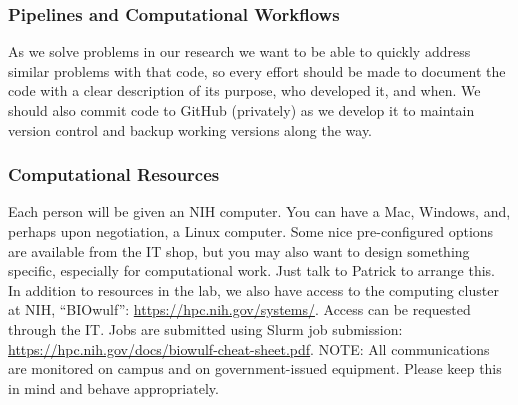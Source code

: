 \documentclass[10pt, letterpaper, twocolumn]{article} %
\begin{document}
\subsubsection{Pipelines and Computational Workflows}
As we solve problems in our research we want to be able to quickly address similar problems with that code, so every effort should be made to document the code with a clear description of its purpose, who developed it, and when. We should also commit code to GitHub (privately) as we develop it to maintain version control and backup working versions along the way. 

\subsubsection{Computational Resources}
Each person will be given an NIH computer. You can have a Mac, Windows, and, perhaps upon negotiation, a Linux computer. Some nice pre-configured options are available from the IT shop, but you may also want to design something specific, especially for computational work. Just talk to Patrick to arrange this.
In addition to resources in the lab, we also have access to the computing cluster at NIH, “BIOwulf”: \href{https://hpc.nih.gov/systems/}{https://hpc.nih.gov/systems/}. Access can be requested through the IT. Jobs are submitted using Slurm job submission: \href{https://hpc.nih.gov/docs/biowulf-cheat-sheet.pdf}{https://hpc.nih.gov/docs/biowulf-cheat-sheet.pdf}.
\newline
NOTE: All communications are monitored on campus and on government-issued equipment. Please keep this in mind and behave appropriately.
\end{document}
